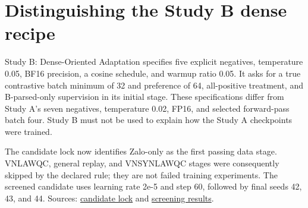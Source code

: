 \section{Distinguishing the Study B dense recipe}

Study B: Dense-Oriented Adaptation specifies five explicit negatives, temperature 0.05, BF16 precision, a cosine schedule, and warmup ratio 0.05. It asks for a true contrastive batch minimum of 32 and preference of 64, all-positive treatment, and B-parsed-only supervision in its initial stage. These specifications differ from Study A's seven negatives, temperature 0.02, FP16, and selected forward-pass batch four. Study B must not be used to explain how the Study A checkpoints were trained.

The candidate lock now identifies Zalo-only as the first passing data stage. VNLAWQC, general replay, and VNSYNLAWQC stages were consequently skipped by the declared rule; they are not failed training experiments. The screened candidate uses learning rate 2e-5 and step 60, followed by final seeds 42, 43, and 44. Sources: \href{../experiments/LEGAL_BGE_DENSE_BENCH_20260830T054623Z_6a8c7b00/candidate_lock.json}{candidate lock} and \href{../experiments/LEGAL_BGE_DENSE_BENCH_20260830T054623Z_6a8c7b00/cv_results/zalo_only_screening_cv.json}{screening results}.

